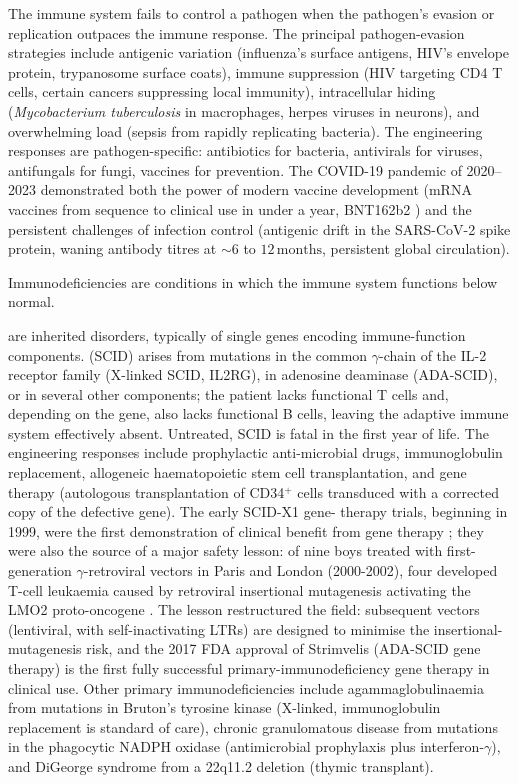  The immune system fails to control a pathogen
when the pathogen's evasion or replication outpaces the immune
response. The principal pathogen-evasion strategies include antigenic
variation (influenza's surface antigens, HIV's envelope protein,
trypanosome surface coats), immune suppression (HIV targeting CD4 T
cells, certain cancers suppressing local immunity), intracellular
hiding (\emph{Mycobacterium tuberculosis} in macrophages, herpes
viruses in neurons), and overwhelming load (sepsis from rapidly
replicating bacteria). The engineering responses are
pathogen-specific: antibiotics for bacteria, antivirals for viruses,
antifungals for fungi, vaccines for prevention. The COVID-19 pandemic
of 2020--2023 demonstrated both the power of modern vaccine
development (mRNA vaccines from sequence to clinical use in under a
year, BNT162b2 \cite{paper:v6c07-mrna-pfizer-2020}) and the
persistent challenges of infection control (antigenic drift in the
SARS-CoV-2 spike protein, waning antibody titres at $\sim 6$ to
$12\,\text{months}$, persistent global circulation).

 Immunodeficiencies are conditions in
which the immune system functions below normal.

 are inherited disorders,
typically of single genes encoding immune-function components.
 (SCID) arises from
mutations in the common $\gamma$-chain of the IL-2 receptor family
(X-linked SCID, IL2RG), in adenosine deaminase (ADA-SCID), or in
several other components; the patient lacks functional T cells and,
depending on the gene, also lacks functional B cells, leaving the
adaptive immune system effectively absent. Untreated, SCID is fatal
in the first year of life. The engineering responses include
prophylactic anti-microbial drugs, immunoglobulin replacement,
allogeneic haematopoietic stem cell transplantation, and gene therapy
(autologous transplantation of CD34$^+$ cells transduced with a
corrected copy of the defective gene). The early SCID-X1 gene-
therapy trials, beginning in 1999, were the first demonstration of
clinical benefit from gene therapy
\cite{paper:v6c07-fischer-scid-2010}; they were also the source of a
major safety lesson: of nine boys treated with first-generation
$\gamma$-retroviral vectors in Paris and London (2000-2002), four
developed T-cell leukaemia caused by retroviral insertional
mutagenesis activating the LMO2 proto-oncogene
\cite{paper:v6c07-fischer-scid-2010}. The lesson restructured the
field: subsequent vectors (lentiviral, with self-inactivating LTRs)
are designed to minimise the insertional-mutagenesis risk, and the
2017 FDA approval of Strimvelis (ADA-SCID gene therapy) is the first
fully successful primary-immunodeficiency gene therapy in clinical
use. Other primary immunodeficiencies include agammaglobulinaemia
from mutations in Bruton's tyrosine kinase (X-linked,
immunoglobulin replacement is standard of care), chronic
granulomatous disease from mutations in the phagocytic NADPH oxidase
(antimicrobial prophylaxis plus interferon-$\gamma$), and DiGeorge
syndrome from a 22q11.2 deletion (thymic transplant).

